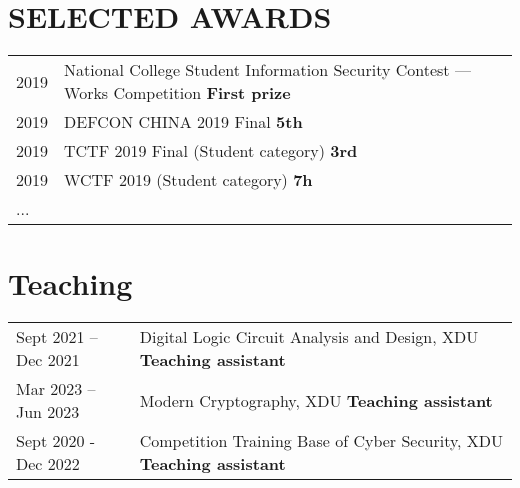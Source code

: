 \documentclass[a4paper,12pt]{article}
\begin{document}
\section{SELECTED AWARDS}
\begin{tabularx}{\linewidth}{@{}l X@{}}	

2019 & National College Student Information Security Contest — Works Competition \hfill{\textbf{First prize}} \\
2019 & DEFCON CHINA 2019 Final \hfill{\textbf{5th}} \\
2019 & TCTF 2019 Final (Student category) \hfill{\textbf{3rd}} \\
2019 & WCTF 2019 (Student category) \hfill{\textbf{7h}} \\
...

\end{tabularx}


\section{Teaching}
\begin{tabularx}{\linewidth}{@{}l X@{}}	

Sept 2021 – Dec 2021 & Digital Logic Circuit Analysis and Design, XDU \hfill{\textbf{Teaching assistant}} \\
Mar 2023 – Jun 2023 & Modern Cryptography, XDU \hfill{\textbf{Teaching assistant}} \\
Sept 2020 - Dec 2022 & Competition Training Base of Cyber Security, XDU \hfill{\textbf{Teaching assistant}} \\
\end{tabularx}

\end{document}
